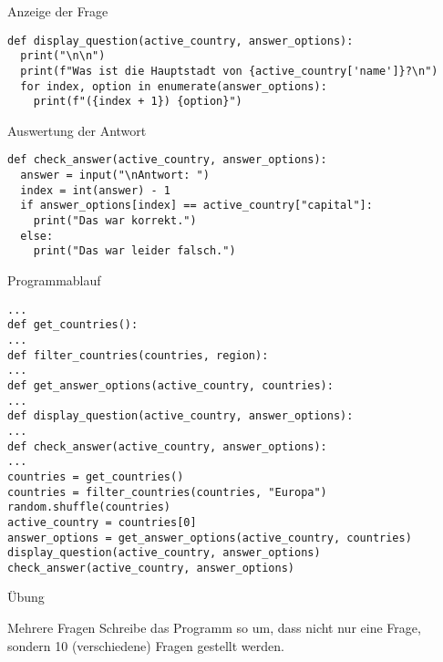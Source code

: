 \begin{fragile}
\begin{block}{Anzeige der Frage}
\vspace{2pt}
\begin{verbatim}
def display_question(active_country, answer_options):
  print("\n\n")
  print(f"Was ist die Hauptstadt von {active_country['name']}?\n")
  for index, option in enumerate(answer_options):
    print(f"({index + 1}) {option}")
\end{verbatim}
\end{block}

\vspace{12pt}
\pause 

\begin{block}{Auswertung der Antwort}
	\vspace{2pt}
	\begin{verbatim}
def check_answer(active_country, answer_options):
  answer = input("\nAntwort: ")
  index = int(answer) - 1
  if answer_options[index] == active_country["capital"]:
    print("Das war korrekt.")
  else:
    print("Das war leider falsch.")
\end{verbatim}
\end{block}

\end{fragile}


\begin{fragile}
\begin{block}{Programmablauf}
\vspace{2pt}
\begin{verbatim}
...	
def get_countries():
...
def filter_countries(countries, region):
...
def get_answer_options(active_country, countries):
...
def display_question(active_country, answer_options):
...
def check_answer(active_country, answer_options):
...
countries = get_countries()
countries = filter_countries(countries, "Europa")
random.shuffle(countries)
active_country = countries[0]
answer_options = get_answer_options(active_country, countries)
display_question(active_country, answer_options)
check_answer(active_country, answer_options)	
\end{verbatim}
\end{block}
\end{fragile}


\begin{frame}{Übung}
\begin{block}{Mehrere Fragen}
\vspace{2pt}
Schreibe das Programm so um, dass nicht nur eine Frage, sondern 10 (verschiedene) Fragen gestellt werden. 
\end{block}
\end{frame}



